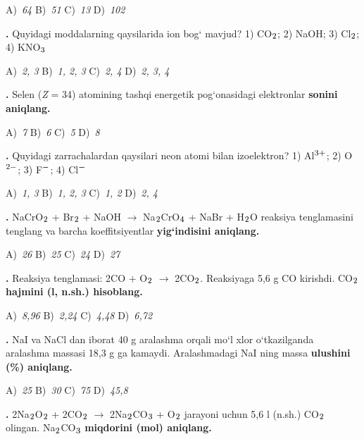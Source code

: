 \documentclass[11pt,a4paper]{article}
\renewcommand{\textsubscript}[1]{\ensuremath{_{\text{\fontsize{8}{8}\selectfont #1}}}}
\renewcommand{\textsuperscript}[1]{\ensuremath{^{\text{\fontsize{8}{8}\selectfont #1}}}}
\newcommand{\qn}[1]{\textbf{\fontsize{11.5}{13}\selectfont #1}}
\newcommand{\qsep}{\par\vspace{1pt}\noindent\rule{0pt}{0.4pt}\par\vspace{5pt}}
\begin{document}
\begin{multicols}{2}
\noindent A)~\textsl{64} \hfill B)~\textsl{51} \hfill C)~\textsl{13} \hfill D)~\textsl{102}\par
\qsep
\noindent\qn{10.} Quyidagi moddalarning qaysilarida ion bog` mavjud? 1) CO\textsubscript{2}; 2) NaOH; 3) Cl\textsubscript{2}; 4) KNO\textsubscript{3}

\noindent A)~\textsl{2, 3} \hfill B)~\textsl{1, 2, 3} \hfill C)~\textsl{2, 4} \hfill D)~\textsl{2, 3, 4}\par
\qsep
\noindent\qn{11.} Selen (\textit{Z} = 34) atomining tashqi energetik pog`onasidagi elektronlar \textbf{sonini aniqlang.}

\noindent A)~\textsl{7} \hfill B)~\textsl{6} \hfill C)~\textsl{5} \hfill D)~\textsl{8}\par
\qsep
\noindent\qn{12.} Quyidagi zarrachalardan qaysilari neon atomi bilan izoelektron? 1) Al\textsuperscript{3+}; 2) O\textsuperscript{2$-$}; 3) F\textsuperscript{$-$}; 4) Cl\textsuperscript{$-$}

\noindent A)~\textsl{1, 3} \hfill B)~\textsl{1, 2, 3} \hfill C)~\textsl{1, 2} \hfill D)~\textsl{2, 4}\par
\qsep
\noindent\qn{13.} NaCrO\textsubscript{2} + Br\textsubscript{2} + NaOH $\to$ Na\textsubscript{2}CrO\textsubscript{4} + NaBr + H\textsubscript{2}O reaksiya tenglamasini tenglang va barcha koeffitsiyentlar \textbf{yig`indisini aniqlang.}

\noindent A)~\textsl{26} \hfill B)~\textsl{25} \hfill C)~\textsl{24} \hfill D)~\textsl{27}\par
\qsep
\noindent\qn{14.} Reaksiya tenglamasi: 2CO + O\textsubscript{2} $\to$ 2CO\textsubscript{2}. Reaksiyaga 5,6 g CO kirishdi. CO\textsubscript{2} \textbf{hajmini (l, n.sh.) hisoblang.}

\noindent A)~\textsl{8,96} \hfill B)~\textsl{2,24} \hfill C)~\textsl{4,48} \hfill D)~\textsl{6,72}\par
\qsep
\noindent\qn{15.} NaI va NaCl dan iborat 40 g aralashma orqali mo`l xlor o`tkazilganda aralashma massasi 18,3 g ga kamaydi. Aralashmadagi NaI ning massa \textbf{ulushini (\%) aniqlang.}

\noindent A)~\textsl{25} \hfill B)~\textsl{30} \hfill C)~\textsl{75} \hfill D)~\textsl{45,8}\par
\qsep
\noindent\qn{16.} 2Na\textsubscript{2}O\textsubscript{2} + 2CO\textsubscript{2} $\to$ 2Na\textsubscript{2}CO\textsubscript{3} + O\textsubscript{2} jarayoni uchun 5,6 l (n.sh.) CO\textsubscript{2} olingan. Na\textsubscript{2}CO\textsubscript{3} \textbf{miqdorini (mol) aniqlang.}


\end{multicols}
\end{document}
